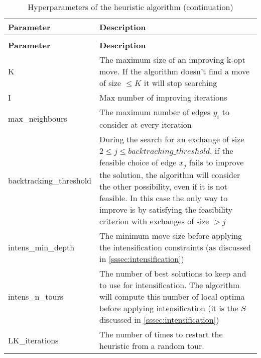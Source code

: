
\renewcommand{\arraystretch}{1.5}
\setlength{\arrayrulewidth}{1.2pt}
\begin{longtable}{lX}
	\caption{Parameters of the heuristic algorithm}\\
	\hline
	\rowcolor{myred} %
	\color{white}\textbf{Parameter} & \color{white}\textbf{Description}\\
	\hline
	\endfirsthead
	
	\rowcolor{white}
	\caption[]{Hyperparameters of the heuristic algorithm (continuation)}\\
	\hline
	\rowcolor{myred}
	\color{white}\textbf{Parameter} & \color{white}\textbf{Description}\\
	\hline
	\endhead
	\hline %
	\endlastfoot %
	K  & The maximum size of an improving k-opt move. If the algorithm doesn't find a move of size $\le K$ it will stop searching  \\
	I  & Max number of improving iterations \\
	max\_neighbours   & The maximum number of edges $y_i$ to consider at every iteration \\
	backtracking\_threshold & During the search for an exchange of size $2 \le j \le backtracking\_threshold$, if the feasible choice of edge $x_j$ fails to improve the solution, the algorithm will consider the other possibility, even if it is not feasible. In this case the only way to improve is by satisfying the feasibility criterion with exchanges of size $> j$\\
	intens\_min\_depth & The minimum move size before applying the intensification constraints (as discussed in \cref{sssec:intensification})\\
	intens\_n\_tours & The number of best solutions to keep and to use for intensification. The algorithm will compute this number of local optima before applying intensification  (it is the $S$ discussed in \cref{sssec:intensification})\\
	LK\_iterations & The number of times to restart the heuristic from a random tour.
	\label{tab:hyperparameters} \\
\end{longtable}
\setlength{\arrayrulewidth}{1pt}
\renewcommand{\arraystretch}{1}